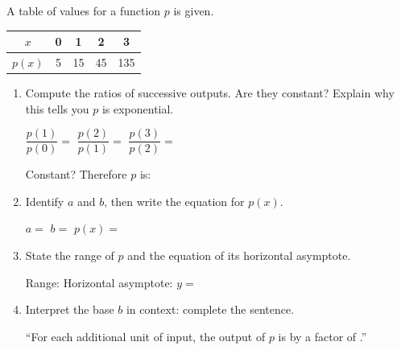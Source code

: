 \documentclass[10pt]{article}
\begin{document}
\vspace{0.08in}

\begin{tcolorbox}[colback=white, colframe=black!40,
    title=\textbf{Tier A --- Apply},
    fonttitle=\bfseries, arc=2mm, left=3mm, right=3mm, top=2mm, bottom=2mm]

A table of values for a function $p$ is given.

\renewcommand{\arraystretch}{1.4}
\begin{tabular}{|c|c|c|c|c|}
\hline
$x$    & 0 & 1  & 2  & 3   \\
\hline
$p(x)$ & 5 & 15 & 45 & 135 \\
\hline
\end{tabular}

\begin{enumerate}[itemsep=10pt]
  \item Compute the ratios of successive outputs. Are they constant? Explain why this tells you
        $p$ is exponential.

        \vspace{0.06in}
        $\dfrac{p(1)}{p(0)} = $ \blank{1.5cm} \quad
        $\dfrac{p(2)}{p(1)} = $ \blank{1.5cm} \quad
        $\dfrac{p(3)}{p(2)} = $ \blank{1.5cm}

        \vspace{0.06in}
        Constant? \blank{1.5cm} \quad Therefore $p$ is: \blank{4cm}

  \item Identify $a$ and $b$, then write the equation for $p(x)$.

        \vspace{0.06in}
        $a = $ \blank{2cm} \quad $b = $ \blank{2cm} \quad $p(x) = $ \blank{5cm}

  \item State the range of $p$ and the equation of its horizontal asymptote.

        \vspace{0.06in}
        Range: \blank{4cm} \quad Horizontal asymptote: $y = $ \blank{2cm}

  \item Interpret the base $b$ in context: complete the sentence.

        \vspace{0.06in}
        ``For each additional unit of input, the output of $p$ is \blank{3cm} by a factor
        of \blank{2cm}.''
\end{enumerate}
\end{tcolorbox}
\end{document}
